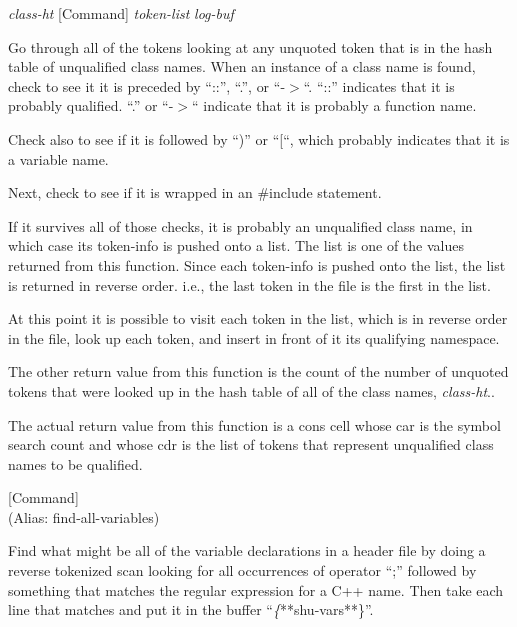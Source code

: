 \vspace{1em}
\noindent
{}
\usebox{\funcname}\emph{class-ht}
 \hfill [Command]
\hspace*{\wd\funcname}\emph{token-list}
\hspace*{\wd\funcname}\emph{log-buf}

\begin{doc-string}
Go through all of the tokens looking at any unquoted token that is in the
hash table of unqualified class names.  When an instance of a class name is
found, check to see it it is preceded by ``::'', ``.'', or ``-$>$``.  ``::''
indicates that it is probably qualified.  ``.'' or ``-$>$`` indicate that it is
probably a function name.

Check also to see if it is followed by ``)'' or ``[``, which probably indicates
that it is a variable name.

Next, check to see if it is wrapped in an \#include statement.

If it survives all of those checks, it is probably an unqualified class name, in
which case its token-info is pushed onto a list.  The list is one of the values
returned from this function.  Since each token-info is pushed onto the list, the
list is returned in reverse order.  i.e., the last token in the file is the
first in the list.

At this point it is possible to visit each token in the list, which is in
reverse order in the file, look up each token, and insert in front of it its
qualifying namespace.

The other return value from this function is the count of the number of unquoted
tokens that were looked up in the hash table of all of the class names,
\emph{class-ht}..

The actual return value from this function is a cons cell whose car is the
symbol search count and whose cdr is the list of tokens that represent
unqualified class names to be qualified.
\end{doc-string}

\vspace{1em}
\noindent
{}
\usebox{\funcname}
 \hfill [Command]\\%
 (Alias: find-all-variables)

\begin{doc-string}
Find what might be all of the variable declarations in a header file by doing
a reverse tokenized scan looking for all occurrences of operator ``;'' followed
by something that matches the regular expression for a C++ name.  Then take each
line that matches and put it in the buffer ``\emph\{**shu-vars**\}''.
\end{doc-string}

